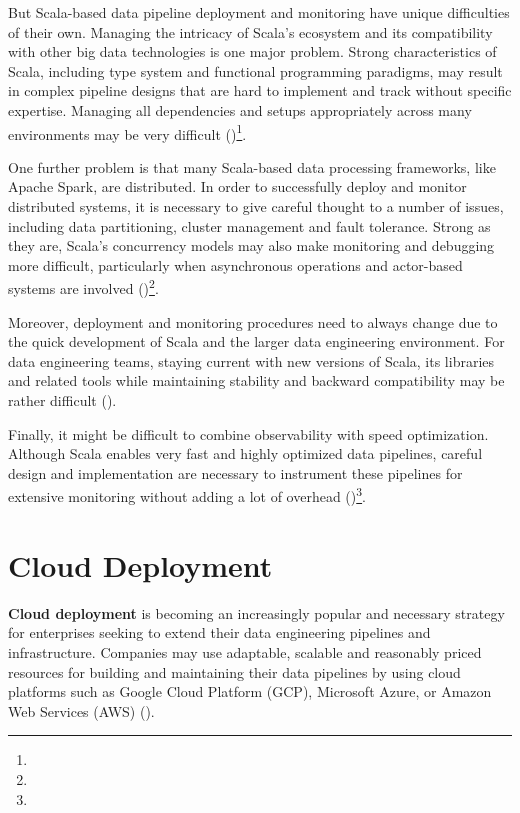 But Scala-based data pipeline deployment and monitoring have unique difficulties of their own. Managing the intricacy of Scala's ecosystem and its compatibility with other big data technologies is one major problem. Strong characteristics of Scala, including type system and functional programming paradigms, may result in complex pipeline designs that are hard to implement and track without specific expertise. Managing all dependencies and setups appropriately across many environments may be very difficult (\cite{odersky.etal_2021})\footnote[2]{}.

One further problem is that many Scala-based data processing frameworks, like Apache Spark, are distributed. In order to successfully deploy and monitor distributed systems, it is necessary to give careful thought to a number of issues, including data partitioning, cluster management and fault tolerance. Strong as they are, Scala's concurrency models may also make monitoring and debugging more difficult, particularly when asynchronous operations and actor-based systems are involved (\cite{damji.etal_2020})\footnote[47]{}.

Moreover, deployment and monitoring procedures need to always change due to the quick development of Scala and the larger data engineering environment. For data engineering teams, staying current with new versions of Scala, its libraries and related tools while maintaining stability and backward compatibility may be rather difficult (\cite{tomeDataEngineeringScala2024})\footnotemark[10].

Finally, it might be difficult to combine observability with speed optimization. Although Scala enables very fast and highly optimized data pipelines, careful design and implementation are necessary to instrument these pipelines for extensive monitoring without adding a lot of overhead (\cite{tomeDataEngineeringScala2024})\footnote[10]{}.

\section{Cloud Deployment}

\textbf{Cloud deployment} is becoming an increasingly popular and necessary strategy for enterprises seeking to extend their data engineering pipelines and infrastructure. Companies may use adaptable, scalable and reasonably priced resources for building and maintaining their data pipelines by using cloud platforms such as Google Cloud Platform (GCP), Microsoft Azure, or Amazon Web Services (AWS) (\cite{tomeDataEngineeringScala2024})\footnotemark[10].

